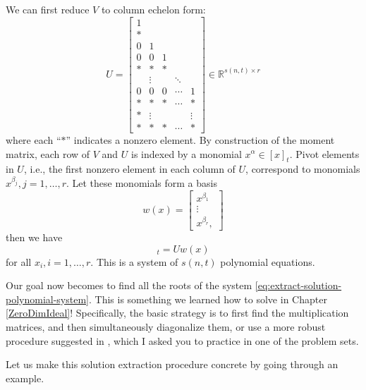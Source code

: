 \documentclass[
]{book}
\theoremstyle{definition}
\theoremstyle{definition}
\theoremstyle{definition}
\theoremstyle{definition}
\theoremstyle{remark}
\begin{document}
We can first reduce \(V\) to column echelon form:
\[
U = \begin{bmatrix}
1 & & & & \\
* & & & & \\
0 & 1 & & & \\
0 & 0 & 1 & & \\
* & * & * & & \\
 & \vdots & & \ddots & \\
 0 & 0 & 0 & \cdots & 1 \\
 * & * & * & \cdots & * \\
 * & \vdots & & & \vdots \\
 * & * & * & \cdots & *  
\end{bmatrix} \in \mathbb{R}^{s(n,t) \times r}
\]
where each ``\(*\)'' indicates a nonzero element. By construction of the moment matrix, each row of \(V\) and \(U\) is indexed by a monomial \(x^{\alpha} \in [x]_t\). Pivot elements in \(U\), i.e., the first nonzero element in each column of \(U\), correspond to monomials \(x^{\beta_j},j=1,\dots,r\). Let these monomials form a basis
\[
w(x) = \begin{bmatrix}
x^{\beta_1} \\ \vdots \\ x^{\beta_r},
\end{bmatrix}
\]
then we have
\begin{equation}
[x]_t = U w(x)
\label{eq:extract-solution-polynomial-system}
\end{equation}
for all \(x_i,i=1,\dots,r\). This is a system of \(s(n,t)\) polynomial equations.

Our goal now becomes to find all the roots of the system \eqref{eq:extract-solution-polynomial-system}. This is something we learned how to solve in Chapter \ref{ZeroDimIdeal}! Specifically, the basic strategy is to first find the multiplication matrices, and then simultaneously diagonalize them, or use a more robust procedure suggested in \citep{corless1997reordered}, which I asked you to practice in one of the problem sets.

Let us make this solution extraction procedure concrete by going through an example.
\end{document}
